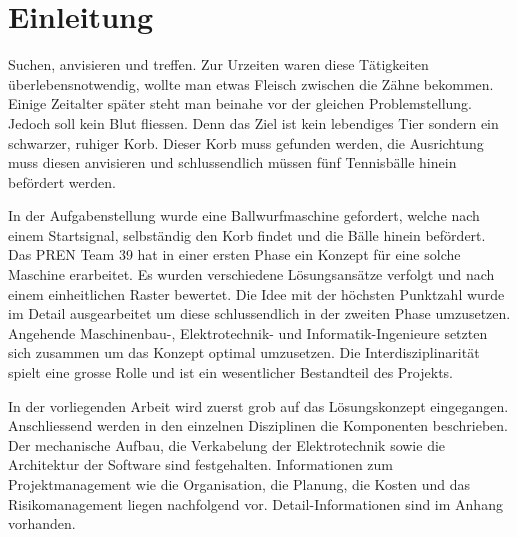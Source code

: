 \section{Einleitung}

Suchen, anvisieren und treffen. Zur Urzeiten waren diese Tätigkeiten überlebensnotwendig, wollte man etwas Fleisch zwischen die Zähne bekommen. Einige Zeitalter später steht man beinahe vor der gleichen Problemstellung. Jedoch soll kein Blut fliessen. Denn das Ziel ist kein lebendiges Tier sondern ein schwarzer, ruhiger Korb. Dieser Korb muss gefunden werden, die Ausrichtung muss diesen anvisieren und schlussendlich müssen fünf Tennisbälle hinein befördert werden.

In der Aufgabenstellung wurde eine Ballwurfmaschine gefordert, welche nach einem Startsignal, selbständig den Korb findet und die Bälle hinein befördert. Das PREN Team 39 hat in einer ersten Phase ein Konzept für eine solche Maschine erarbeitet. Es wurden verschiedene Lösungsansätze verfolgt und nach einem einheitlichen Raster bewertet. Die Idee mit der höchsten Punktzahl wurde im Detail ausgearbeitet um diese schlussendlich in der zweiten Phase umzusetzen. Angehende Maschinenbau-, Elektrotechnik- und Informatik-Ingenieure setzten sich zusammen um das Konzept optimal umzusetzen. Die Interdisziplinarität spielt eine grosse Rolle und ist ein wesentlicher Bestandteil des Projekts.

In der vorliegenden Arbeit wird zuerst grob auf das Lösungskonzept eingegangen. Anschliessend werden in den einzelnen Disziplinen die Komponenten beschrieben. Der mechanische Aufbau, die Verkabelung der Elektrotechnik sowie die Architektur der Software sind festgehalten. Informationen zum Projektmanagement wie die Organisation, die Planung, die Kosten und das Risikomanagement liegen nachfolgend vor. Detail-Informationen sind im Anhang vorhanden.


